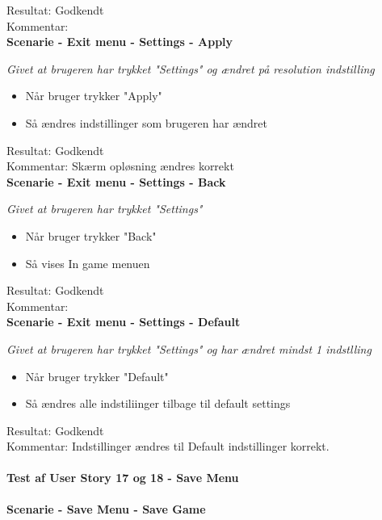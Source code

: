 Resultat: Godkendt\\
Kommentar:\\

\textbf{Scenarie - Exit menu - Settings - Apply}

\textit{Givet at brugeren har trykket "Settings" og ændret på resolution indstilling}

\begin{itemize}
  \item Når bruger trykker "Apply"
  \item Så ændres indstillinger som brugeren har ændret
\end{itemize}

Resultat: Godkendt\\
Kommentar: Skærm opløsning ændres korrekt\\

\textbf{Scenarie - Exit menu - Settings - Back}

\textit{Givet at brugeren har trykket "Settings"}

\begin{itemize}
  \item Når bruger trykker "Back"
  \item Så vises In game menuen
\end{itemize}

Resultat: Godkendt\\
Kommentar:\\

\textbf{Scenarie - Exit menu - Settings - Default}

\textit{Givet at brugeren har trykket "Settings" og har ændret mindst 1 indstlling}

\begin{itemize}
  \item Når bruger trykker "Default"
  \item Så ændres alle indstiliinger tilbage til default settings
\end{itemize}

Resultat: Godkendt\\
Kommentar: Indstillinger ændres til Default indstillinger korrekt.\\

\paragraph{Test af User Story 17 og 18 - Save Menu}

\textbf{Scenarie - Save Menu - Save Game}

